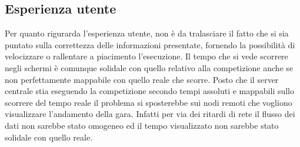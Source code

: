 \subsection{Esperienza utente}
Per quanto rigurarda l’esperienza utente, non è da tralasciare il fatto che si sia puntato sulla correttezza delle informazioni presentate, fornendo la possibilità di velocizzare o rallentare a piacimento l’esecuzione. Il tempo che si vede scorrere negli schermi è comunque solidale con quello relativo alla competizione anche se non perfettamente mappabile con quello reale che scorre. Posto che il server centrale stia eseguendo la competizione secondo tempi assoluti e mappabili sullo scorrere del tempo reale il problema si sposterebbe sui nodi remoti che vogliono visualizzare l'andamento della gara. Infatti per via dei ritardi di rete il flusso dei dati non sarebbe stato omogeneo ed il tempo visualizzato non sarebbe stato solidale con quello reale.